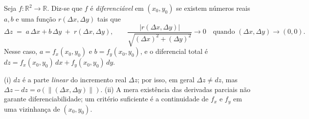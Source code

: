 \begin{definition}
	Seja $f:\mathbb{R}^2\to\mathbb{R}$. Diz-se que $f$ é \emph{diferenciável} em $(x_0,y_0)$ se existem números reais $a,b$ e uma função $r(\Delta x,\Delta y)$ tais que
	\[
	\Delta z \;=\; a\,\Delta x + b\,\Delta y \;+\; r(\Delta x,\Delta y),
	\qquad
	\frac{|r(\Delta x,\Delta y)|}{\sqrt{(\Delta x)^2+(\Delta y)^2}}\longrightarrow 0
	\quad\text{quando }(\Delta x,\Delta y)\to(0,0).
	\]
	Nesse caso, $a=f_x(x_0,y_0)$ e $b=f_y(x_0,y_0)$, e o diferencial total é $dz=f_x(x_0,y_0)\,dx+f_y(x_0,y_0)\,dy$.
\end{definition}

\begin{remark}
	(i) $dz$ é a parte \emph{linear} do incremento real $\Delta z$; por isso, em geral $\Delta z\neq dz$, mas $\Delta z - dz = o(\|( \Delta x,\Delta y)\|)$. 
	(ii) A mera existência das derivadas parciais não garante diferenciabilidade; um critério suficiente é a continuidade de $f_x$ e $f_y$ em uma vizinhança de $(x_0,y_0)$.
\end{remark}
